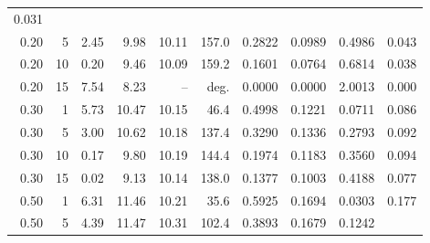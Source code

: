 \begin{table}[!htb]
\begin{tabular}{r r r r r r r r r r}
    0.031
    \\
    0.20                   & 5                            & 2.45          & 9.98
                           & 10.11                        & 157.0         &
    0.2822                 & 0.0989                       & 0.4986        &
    0.043
    \\
    0.20                   & 10                           & 0.20          & 9.46
                           & 10.09                        & 159.2         &
    0.1601                 & 0.0764                       & 0.6814        &
    0.038
    \\
    0.20                   & 15                           & 7.54          & 8.23
                           & --                           & deg.          &
    0.0000                 & 0.0000                       & 2.0013        &
    0.000                                                                            \\
    \midrule
    0.30                   & 1                            & 5.73          &
    10.47                  & 10.15                        & 46.4
                           & 0.4998                       & 0.1221        & 0.0711 &
    0.086
    \\
    0.30                   & 5                            & 3.00          &
    10.62                  & 10.18                        & 137.4
                           & 0.3290                       & 0.1336        & 0.2793 &
    0.092
    \\
    0.30                   & 10                           & 0.17          & 9.80
                           & 10.19                        & 144.4         &
    0.1974                 & 0.1183                       & 0.3560        &
    0.094
    \\
    0.30                   & 15                           & 0.02          & 9.13
                           & 10.14                        & 138.0         &
    0.1377                 & 0.1003                       & 0.4188        &
    0.077
    \\
    \midrule
    0.50                   & 1                            & 6.31          &
    11.46                  & 10.21                        & 35.6
                           & 0.5925                       & 0.1694        & 0.0303 &
    0.177
    \\
    0.50                   & 5                            & 4.39          &
    11.47                  & 10.31                        & 102.4
                           & 0.3893                       & 0.1679        & 0.1242 &

\end{tabular}
\end{table}
